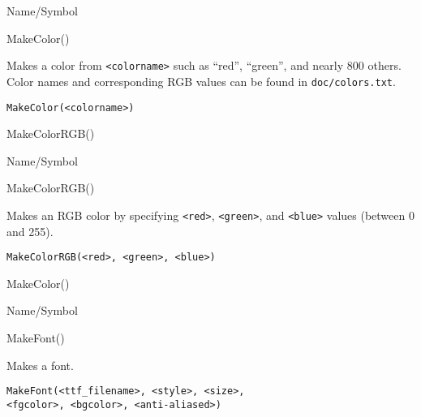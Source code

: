 \rl




\begin{desc}{Name/Symbol}
\item[Name/Symbol]	MakeColor()

\item[Description]	Makes a color from \verb+<colorname>+ such as ``red'', ``green'', and nearly 800 others.  Color names and corresponding RGB 
		values can be found in \texttt{doc/colors.txt}.

\item[Usage]
\begin{verbatim}
MakeColor(<colorname>)
\end{verbatim}

\item[Example]	

\item[See Also]	MakeColorRGB()
\end{desc}

\rl


\begin{desc}{Name/Symbol}
\item[Name/Symbol]	MakeColorRGB() 

\item[Description]	Makes an RGB color by specifying \verb+<red>+, \verb+<green>+, and 
		\verb+<blue>+ values (between 0 and 255).

\item[Usage]		
\begin{verbatim}
MakeColorRGB(<red>, <green>, <blue>)
\end{verbatim}

\item[Example]	

\item[See Also]	MakeColor()
\end{desc}

\rl





\begin{desc}{Name/Symbol}
\item[Name/Symbol]	MakeFont() 

\item[Description]	Makes a font.

\item[Usage]
\begin{verbatim}
MakeFont(<ttf_filename>, <style>, <size>, 
<fgcolor>, <bgcolor>, <anti-aliased>)
\end{verbatim}

\item[Example]	

\item[See Also]	
\end{desc}

